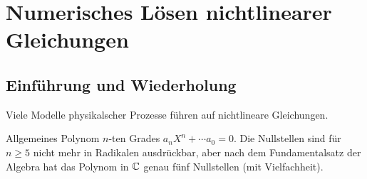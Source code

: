 \section{Numerisches Lösen nichtlinearer Gleichungen}

\subsection{Einführung und Wiederholung}

Viele Modelle physikalscher Prozesse führen auf nichtlineare Gleichungen.

\begin{example}
    Allgemeines Polynom $n$-ten Grades $a_nX^n+\cdots a_0=0$. Die Nullstellen sind für $n\geq 5$ nicht mehr in Radikalen ausdrückbar, aber nach dem Fundamentalsatz der Algebra hat das Polynom in $\mathbb{C}$ genau fünf Nullstellen (mit Vielfachheit).
\end{example}

